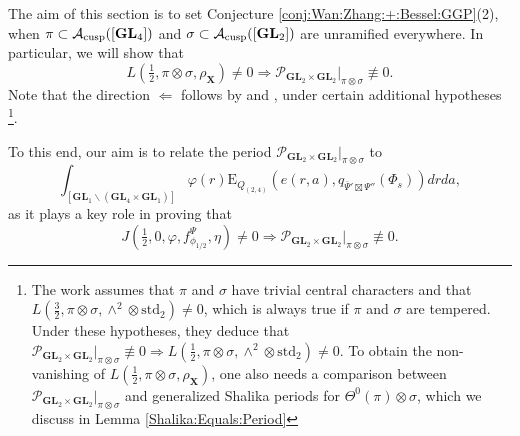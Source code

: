 \documentclass[11pt, reqno]{amsart}
\theoremstyle{plain}
\theoremstyle{definition}
\theoremstyle{remark}
\theoremstyle{plain}
\def\GL{\mathbf{GL}}
\begin{document}
The aim of this section is to set Conjecture \ref{conj:Wan:Zhang:+:Bessel:GGP}(2), when $\pi \subset \mathcal{A}_{\rm cusp}([\GL_4])$ and $\sigma \subset \mathcal{A}_{\rm cusp}([\GL_2])$ are unramified everywhere. In particular, we will show that $$ L(\tfrac{1}{2}, \pi \otimes \sigma, \rho_{\mathbf{X}}) \ne 0 \Longrightarrow \mathcal{P}_{\GL_2 \times \GL_2}|_{\pi \otimes \sigma} \not \equiv 0.$$ 
Note that the direction $\Longleftarrow$ follows by \cite[Corollary 1.3(6)]{Pollack:Wan:Zydor} and \cite[Theorem 1.1]{Watanabe:Global:Theta}, under certain additional hypotheses \footnote{The work \cite{Pollack:Wan:Zydor} assumes that $\pi$ and $\sigma$ have trivial central characters and that $L(\frac{3}{2},\pi \otimes \sigma,\wedge^2\otimes\mathrm{std}_2)\neq 0$, which is always true if $\pi$ and $\sigma$ are tempered. Under these hypotheses, they deduce that $\mathcal{P}_{\GL_2 \times \GL_2}|_{\pi \otimes \sigma} \not \equiv 0 \Longrightarrow L(\frac{1}{2},\pi \otimes \sigma,\wedge^2\otimes\mathrm{std}_2)\neq 0$. To obtain the non-vanishing of $L(\tfrac{1}{2}, \pi \otimes \sigma, \rho_{\mathbf{X}})$, one also needs a comparison between $\mathcal{P}_{\GL_2 \times \GL_2}|_{\pi \otimes \sigma}$ and generalized Shalika periods for $\Theta^0(\pi) \otimes \sigma$, which we discuss in Lemma \ref{Shalika:Equals:Period}}. 

To this end, our aim is to relate the period $\mathcal{P}_{\GL_2 \times \GL_2}|_{\pi \otimes \sigma}$ to
\begin{equation}\label{Integral:Section:Period:Final}\int_{[ \GL_1 \backslash (\GL_4 \times \GL_1)]}\varphi(r)\mathrm{E}_{Q_{(2,4)}}(e(r,a),q_{\overline{\Psi}'\boxtimes\Psi''}(\Phi_{s})) drda,\end{equation}
as it plays a key role in proving that $$J(\tfrac{1}{2},0,\varphi,f^\Psi_{\phi_{1/2}}, \eta) \ne 0  \Longrightarrow {\mathcal{P}_{ \GL_2 \times \GL_2}}|_{\pi \otimes \sigma} \not \equiv 0.$$
\end{document}
